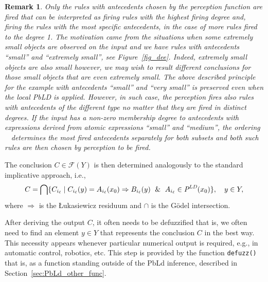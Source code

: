 \documentclass[review]{elsarticle}
\newcommand{\code}[1]{\texttt{#1}}
\newtheorem{rem}{Remark}
\newcommand{\LD}{\text{\it LD}}
\newcommand{\LPerc}{\text{\it P}}
\def\llp{\mathop{\le_{x_0} }\nolimits}
\begin{document}
\begin{rem}\label{rem:perception}
Only the rules with antecedents chosen by the perception function are fired that can be interpreted as firing rules with the highest firing degree and, firing the rules with the most specific antecedents, in the case of more rules fired to the degree 1. The motivation came from the situations when some extremely small objects are observed on the input and we have rules with antecedents ``small'' and ``extremely small'', see Figure~\ref{fig_dee}. Indeed, extremely small objects are also small however, we may wish to result different conclusions for those small objects that are even extremely small. The above described principle for the example with antecedents ``small'' and ``very small'' is preserved even when the \emph{local PbLD} is applied. However, in such case, the perception fires also rules with antecedents of the different type no matter that they are fired in distinct degrees. If the input has a non-zero membership degree to antecedents with expressions derived from atomic expressions ``small'' and ``medium'', the ordering $\llp$ determines the most fired antecedents separately for both subsets and both such rules are then chosen by perception to be fired.
\end{rem}


The conclusion $C\in\mathcal{F}(Y)$ is then determined analogously to the standard implicative approach, i.e., 
\begin{equation}
C = \bigcap \{C_{i_\ell}\mid
C_{i_\ell}(y)=A_{i_\ell}(x_0)\Rightarrow B_{i_\ell}(y) \; \  \& \; \
A_{i_\ell}\in \LPerc^{\LD}(x_0) \}, \quad y\in Y, \label{form:PBLDconclusion} 
\end{equation}
{\rm where $\Rightarrow$ is the \L ukasiewicz residuum and $\cap$
is the G\"{o}del intersection.}




After deriving the output $C$, it often needs to be defuzzified that is, we often need to find an element $y\in Y$ that represents the conclusion $C$ in the best way. This necessity appears whenever particular numerical output is required, e.g., in automatic control, robotics, etc. This step is provided by the function \code{defuzz()} that is, as a function standing outside of the PbLd inference, described in Section~\ref{sec:PbLd_other_func}.
\end{document}
